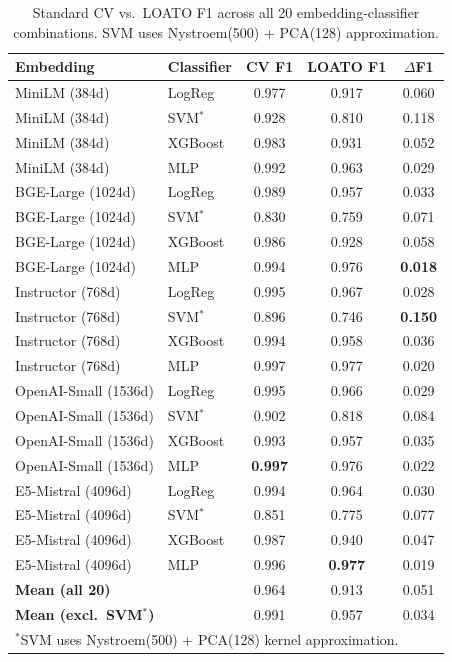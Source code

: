 \documentclass[11pt,a4paper]{article}
\newcommand{\df}{$\Delta$F1}
\newcommand{\Fone}{F1}
\begin{document}
\begin{table}[t]
\centering
\small
\caption{Standard CV vs.\ LOATO \Fone{} across all 20 embedding-classifier
  combinations. SVM uses Nystroem(500) + PCA(128) approximation.}
\label{tab:full-results}
\begin{tabular}{llccc}
\toprule
\textbf{Embedding} & \textbf{Classifier} & \textbf{CV \Fone{}} & \textbf{LOATO \Fone{}} & \textbf{\df{}} \\
\midrule
MiniLM (384d) & LogReg & 0.977 & 0.917 & 0.060 \\
MiniLM (384d) & SVM$^*$ & 0.928 & 0.810 & 0.118 \\
MiniLM (384d) & XGBoost & 0.983 & 0.931 & 0.052 \\
MiniLM (384d) & MLP & 0.992 & 0.963 & 0.029 \\
\midrule
BGE-Large (1024d) & LogReg & 0.989 & 0.957 & 0.033 \\
BGE-Large (1024d) & SVM$^*$ & 0.830 & 0.759 & 0.071 \\
BGE-Large (1024d) & XGBoost & 0.986 & 0.928 & 0.058 \\
BGE-Large (1024d) & MLP & 0.994 & 0.976 & \textbf{0.018} \\
\midrule
Instructor (768d) & LogReg & 0.995 & 0.967 & 0.028 \\
Instructor (768d) & SVM$^*$ & 0.896 & 0.746 & \textbf{0.150} \\
Instructor (768d) & XGBoost & 0.994 & 0.958 & 0.036 \\
Instructor (768d) & MLP & 0.997 & 0.977 & 0.020 \\
\midrule
OpenAI-Small (1536d) & LogReg & 0.995 & 0.966 & 0.029 \\
OpenAI-Small (1536d) & SVM$^*$ & 0.902 & 0.818 & 0.084 \\
OpenAI-Small (1536d) & XGBoost & 0.993 & 0.957 & 0.035 \\
OpenAI-Small (1536d) & MLP & \textbf{0.997} & 0.976 & 0.022 \\
\midrule
E5-Mistral (4096d) & LogReg & 0.994 & 0.964 & 0.030 \\
E5-Mistral (4096d) & SVM$^*$ & 0.851 & 0.775 & 0.077 \\
E5-Mistral (4096d) & XGBoost & 0.987 & 0.940 & 0.047 \\
E5-Mistral (4096d) & MLP & 0.996 & \textbf{0.977} & 0.019 \\
\midrule
\multicolumn{2}{l}{\textbf{Mean (all 20)}} & 0.964 & 0.913 & 0.051 \\
\multicolumn{2}{l}{\textbf{Mean (excl.\ SVM$^*$)}} & 0.991 & 0.957 & 0.034 \\
\bottomrule
\multicolumn{5}{l}{\footnotesize $^*$SVM uses Nystroem(500) + PCA(128)
  kernel approximation.}
\end{tabular}
\end{table}
\end{document}

